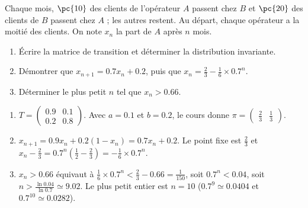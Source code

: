 \begin{exercise}
Chaque mois, $\pc{10}$ des clients de l'opérateur $A$ passent chez $B$ et $\pc{20}$ des clients de $B$ passent chez $A$ ; les autres restent. Au départ, chaque opérateur a la moitié des clients. On note $x_n$ la part de $A$ après $n$ mois.
\begin{enumerate}
\item Écrire la matrice de transition et déterminer la distribution invariante.
\item Démontrer que $x_{n+1}=\num{0,7}x_n+\num{0,2}$, puis que $x_n=\frac23-\frac16\times\num{0,7}^n$.
\item Déterminer le plus petit $n$ tel que $x_n>\num{0,66}$.
\end{enumerate}
\end{exercise}
\begin{solution}
\begin{enumerate}
\item $T=\begin{pmatrix}\num{0,9}&\num{0,1}\\\num{0,2}&\num{0,8}\end{pmatrix}$. Avec $a=\num{0,1}$ et $b=\num{0,2}$, le cours donne $\pi=\begin{pmatrix}\frac23&\frac13\end{pmatrix}$.
\item $x_{n+1}=\num{0,9}x_n+\num{0,2}(1-x_n)=\num{0,7}x_n+\num{0,2}$. Le point fixe est $\frac23$ et $x_n-\frac23=\num{0,7}^n\left(\frac12-\frac23\right)=-\frac16\times\num{0,7}^n$.
\item $x_n>\num{0,66}$ équivaut à $\frac16\times\num{0,7}^n<\frac23-\num{0,66}=\frac1{150}$, soit $\num{0,7}^n<\num{0,04}$, soit $n>\frac{\ln\num{0,04}}{\ln\num{0,7}}\simeq\num{9,02}$. Le plus petit entier est $n=10$ ($\num{0,7}^9\simeq\num{0,0404}$ et $\num{0,7}^{10}\simeq\num{0,0282}$).
\end{enumerate}
\end{solution}

